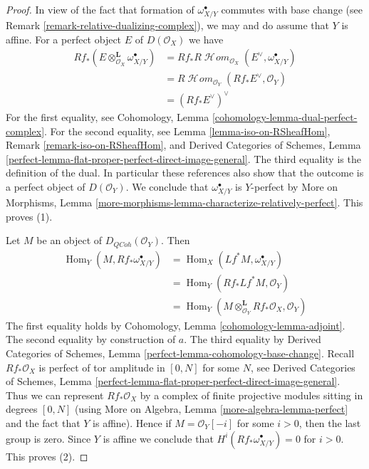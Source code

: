 \documentclass[10pt,a4paper]{amsart}
\theoremstyle{plain}
\theoremstyle{definition}
\theoremstyle{remark}
\numberwithin{equation}{subsection}
\def\Hom{\mathop{\mathrm{Hom}}\nolimits}
\def\SheafHom{\mathop{\mathcal{H}\!\mathit{om}}\nolimits}
\def\QCoh{\mathit{QCoh}}
\begin{document}
\begin{proof}
In view of the fact that formation of $\omega_{X/Y}^\bullet$ commutes
with base change (see Remark \ref{remark-relative-dualizing-complex}),
we may and do assume that $Y$ is affine. For a perfect object $E$ of
$D(\mathcal{O}_X)$ we have
\begin{align*}
Rf_*(E \otimes_{\mathcal{O}_X}^\mathbf{L} \omega_{X/Y}^\bullet)
& =
Rf_*R\SheafHom_{\mathcal{O}_X}(E^\vee, \omega_{X/Y}^\bullet) \\
& =
R\SheafHom_{\mathcal{O}_Y}(Rf_*E^\vee, \mathcal{O}_Y) \\
& =
(Rf_*E^\vee)^\vee
\end{align*}
For the first equality, see
Cohomology, Lemma \ref{cohomology-lemma-dual-perfect-complex}.
For the second equality, see Lemma \ref{lemma-iso-on-RSheafHom},
Remark \ref{remark-iso-on-RSheafHom}, and 
Derived Categories of Schemes, Lemma
\ref{perfect-lemma-flat-proper-perfect-direct-image-general}.
The third equality is the definition of the dual. In particular
these references also show that the outcome is a perfect object
of $D(\mathcal{O}_Y)$. We conclude that $\omega_{X/Y}^\bullet$
is $Y$-perfect by More on Morphisms, Lemma
\ref{more-morphisms-lemma-characterize-relatively-perfect}.
This proves (1).

\medskip\noindent
Let $M$ be an object of $D_\QCoh(\mathcal{O}_Y)$. Then
\begin{align*}
\Hom_Y(M, Rf_*\omega_{X/Y}^\bullet) & =
\Hom_X(Lf^*M, \omega_{X/Y}^\bullet) \\
& =
\Hom_Y(Rf_*Lf^*M, \mathcal{O}_Y) \\
& =
\Hom_Y(M \otimes_{\mathcal{O}_Y}^\mathbf{L} Rf_*\mathcal{O}_X, \mathcal{O}_Y)
\end{align*}
The first equality holds by Cohomology, Lemma
\ref{cohomology-lemma-adjoint}.
The second equality by construction of $a$.
The third equality by Derived Categories of Schemes, Lemma
\ref{perfect-lemma-cohomology-base-change}.
Recall $Rf_*\mathcal{O}_X$ is perfect of tor amplitude in $[0, N]$
for some $N$, see
Derived Categories of Schemes, Lemma
\ref{perfect-lemma-flat-proper-perfect-direct-image-general}.
Thus we can represent $Rf_*\mathcal{O}_X$ by a complex of
finite projective modules sitting in degrees $[0, N]$
(using More on Algebra, Lemma \ref{more-algebra-lemma-perfect}
and the fact that $Y$ is affine).
Hence if $M = \mathcal{O}_Y[-i]$ for some $i > 0$, then the last
group is zero. Since $Y$ is affine we conclude that
$H^i(Rf_*\omega_{X/Y}^\bullet) = 0$ for $i > 0$.
This proves (2).


\end{proof}
\end{document}

